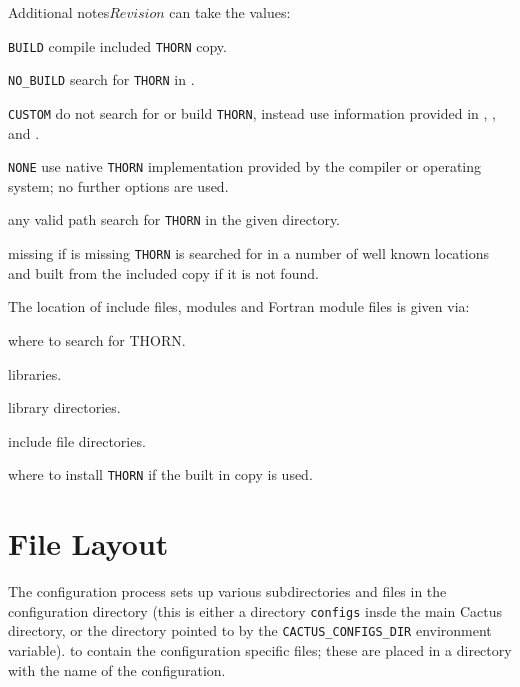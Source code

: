 \begin{cactuspart}{Additional notes}{}{$Revision$}
\texttt{} can take the values:
\begin{Lentry}
\item [\texttt{BUILD}] compile included \texttt{THORN} copy.
\item [\texttt{NO\_BUILD}] search for \texttt{THORN} in
      \texttt{}.
\item [\texttt{CUSTOM}] do not search for or build \texttt{THORN}, instead use
      information provided in \texttt{},
      \texttt{}, and \texttt{}.
\item [\texttt{NONE}] use native \texttt{THORN} implementation provided by the
      compiler or operating system; no further options are used.
\item [any valid path] search for \texttt{THORN} in the given directory.
\item [missing] if \texttt{} is missing \texttt{THORN} is searched for in
      a number of well known locations and built from the included copy if
      it is not found.
\end{Lentry}


The location of include files, modules and Fortran module files is given via:
\begin{Lentry}
\item [\texttt{\var{THORN\_DIR}}] where to search for THORN.
\item [\texttt{\var{THORN\_LIBS}}] libraries.
\item [\texttt{\var{THORN\_LIB\_DIRS}}] library directories.
\item [\texttt{\var{THORN\_INC\_DIRS}}] include file directories.
\item [\texttt{\var{THORN\_INSTALL\_DIR}}] where to install \texttt{THORN} if the
      built in copy is used.
\end{Lentry}

\section{File Layout}
\label{file_layout}

The configuration process sets up various subdirectories and files in the
configuration
directory (this is either a directory
\texttt{configs} insde the main Cactus directory, or the
directory pointed to by the \texttt{CACTUS\_CONFIGS\_DIR} environment
variable).
to contain the configuration specific files; these
are placed in a directory with the name of the configuration.


\end{cactuspart}
